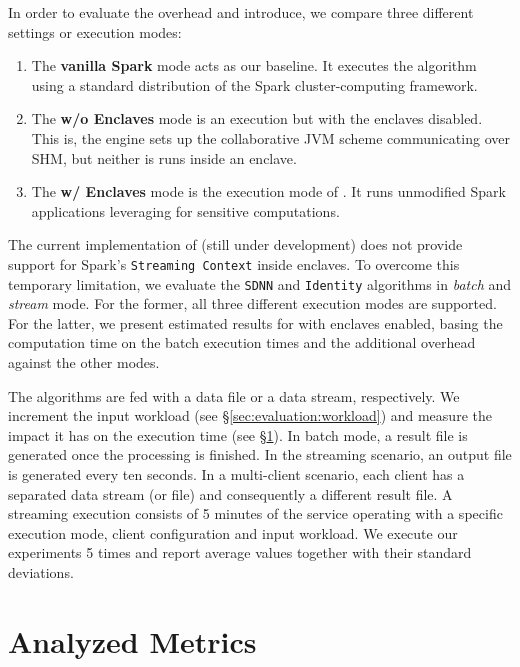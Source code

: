 In order to evaluate the overhead \sgxspark and \projName introduce, we compare three different settings or execution modes:
\begin{enumerate}
    \item The \textbf{vanilla Spark} mode acts as our baseline. It executes the algorithm using a standard distribution of the Spark cluster-computing framework.
    \item The \textbf{\sgxspark w/o Enclaves} mode is an \sgxspark execution but with the enclaves disabled. This is, the engine sets up the collaborative JVM scheme communicating over SHM, but neither is runs inside an enclave.
    \item The \textbf{\sgxspark w/ Enclaves} mode is the execution mode of \projName. It runs unmodified Spark applications leveraging \sgx for sensitive computations.
\end{enumerate}
The current implementation of \sgxspark (still under development) does not provide support for Spark's \texttt{Streaming Context} inside enclaves. 
To overcome this temporary limitation, we evaluate the \texttt{SDNN} and \texttt{Identity} algorithms in \emph{batch} and \emph{stream} mode. 
For the former, all three different execution modes are supported.
For the latter, we present estimated results for \sgxspark with enclaves enabled, basing the computation time on the batch execution times and the additional overhead against the other modes.

The algorithms are fed with a data file or a data stream, respectively.
We increment the input workload (see \S\ref{sec:evaluation:workload}) and measure the impact it has on the execution time (see \S\ref{sec:evaluation:metrics}).
In batch mode, a result file is generated once the processing is finished.
In the streaming scenario, an output file is generated every ten seconds.
In a multi-client scenario, each client has a separated data stream (or file) and consequently a different result file.
A streaming execution consists of 5 minutes of the service operating with a specific execution mode, client configuration and input workload.
We execute our experiments 5 times and report average values together with their standard deviations.

\section{Analyzed Metrics} \label{sec:evaluation:metrics}

